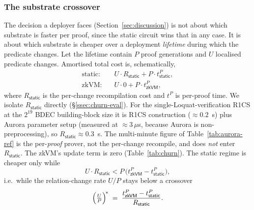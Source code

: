 \subsubsection{The substrate crossover}\label{sssec:crossover}
The decision a deployer faces (Section~\ref{sec:discussion}) is not about which substrate is faster per proof, since the static circuit wins that in any case. It is about which substrate is cheaper over a deployment \emph{lifetime} during which the predicate changes. Let the lifetime contain $P$ proof generations and $U$ localised predicate changes. Amortised total cost is, schematically,
\begin{align}
  \text{static:}\quad & U\cdot R_{\mathsf{static}} + P\cdot t^{P}_{\mathsf{static}},
  \label{eq:static-cost}\\
  \text{zkVM:}\quad & U\cdot 0 + P\cdot t^{P}_{\mathsf{zkVM}},
  \label{eq:zkvm-cost}
\end{align}
where $R_{\mathsf{static}}$ is the per-change recompilation cost and $t^{P}$ is per-proof time. We isolate $R_{\mathsf{static}}$ directly (\S\ref{ssec:churn-eval}). For the single-Loquat-verification R1CS at the $2^{19}$ BDEC building-block size it is R1CS construction ($\approx 0.2$~s) plus Aurora parameter setup (measured at $\approx 3\,\mu$s, because Aurora is non-preprocessing), so $R_{\mathsf{static}}\approx 0.3$~s. The multi-minute figure of Table~\ref{tab:aurora-ref} is the per-\emph{proof} prover, not the per-change recompile, and does \emph{not} enter $R_{\mathsf{static}}$. The zkVM's update term is zero (Table~\ref{tab:churn}). The static regime is cheaper only while
\begin{equation*}
  U\cdot R_{\mathsf{static}} < P\,\bigl(t^{P}_{\mathsf{zkVM}}-t^{P}_{\mathsf{static}}\bigr),
\end{equation*}
i.e.\ while the relation-change rate $U/P$ stays below a crossover
\begin{equation}
  \Bigl(\tfrac{U}{P}\Bigr)^{\!*} \;=\; \frac{t^{P}_{\mathsf{zkVM}}-t^{P}_{\mathsf{static}}}{R_{\mathsf{static}}}.
  \label{eq:crossover}
\end{equation}
